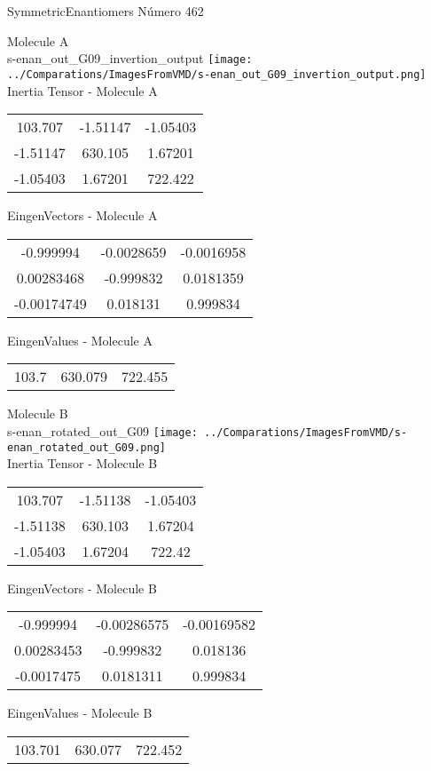 \vtab[-2cm]
\begin{center}
{\large SymmetricEnantiomers \tab Número 462}
\end{center}
\begin{multicols}{2}
\begin{center}

Molecule A \\ 
s-enan\_out\_G09\_invertion\_output
\texttt{[image: ../Comparations/ImagesFromVMD/s-enan\_out\_G09\_invertion\_output.png]}
\\
Inertia Tensor - Molecule A \\
\vtab

\begin{tabular}{|c c c|}
103.707	 & 	-1.51147	 & 	-1.05403	 \\
-1.51147	 & 	630.105	 & 	1.67201	 \\
-1.05403	 & 	1.67201	 & 	722.422
\end{tabular}

\vtab
 EingenVectors - Molecule A     \\
\vtab
\begin{tabular}{|c c c|}
-0.999994	 & 	-0.0028659	 & 	-0.0016958	 \\
0.00283468	 & 	-0.999832	 & 	0.0181359	 \\
-0.00174749	 & 	0.018131	 & 	0.999834
\end{tabular}

\vtab
 EingenValues - Molecule A     \\
\vtab
\begin{tabular}{|c c c|}
103.7	 & 	630.079	 & 	722.455	 \\
\end{tabular}
\columnbreak

Molecule B \\ 
s-enan\_rotated\_out\_G09
\texttt{[image: ../Comparations/ImagesFromVMD/s-enan\_rotated\_out\_G09.png]}
\\
Inertia Tensor - Molecule B \\
\vtab

\begin{tabular}{|c c c|}
103.707	 & 	-1.51138	 & 	-1.05403	 \\
-1.51138	 & 	630.103	 & 	1.67204	 \\
-1.05403	 & 	1.67204	 & 	722.42
\end{tabular}

\vtab
 EingenVectors - Molecule B     \\
\vtab
\begin{tabular}{|c c c|}
-0.999994	 & 	-0.00286575	 & 	-0.00169582	 \\
0.00283453	 & 	-0.999832	 & 	0.018136	 \\
-0.0017475	 & 	0.0181311	 & 	0.999834
\end{tabular}

\vtab
 EingenValues - Molecule B     \\
\vtab
\begin{tabular}{|c c c|}
103.701	 & 	630.077	 & 	722.452	 \\
\end{tabular}

\end{center}
\end{multicols}
